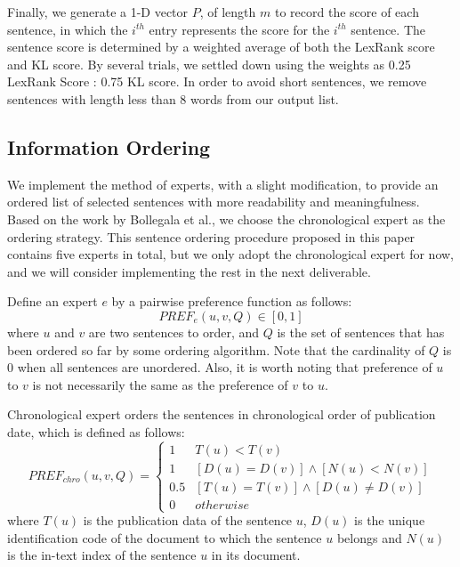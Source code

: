 \documentclass[11pt]{article}
\begin{document}
\indent
Finally, we generate a 1-D vector $P$,  of length $m$ to record the score of each sentence, in which the $i^{th}$ entry represents the score for the $i^{th}$ sentence. The sentence score is determined by a weighted average of both the LexRank score and KL score. By several trials, we settled down using the weights as 0.25 LexRank Score : 0.75 KL score. In order to avoid short sentences, we remove sentences with length less than 8 words from our output list. \\

\subsection{Information Ordering}

We implement the method of experts, with a slight modification, to provide an ordered list of selected sentences with more readability and meaningfulness. Based on the work by Bollegala et al., we choose the chronological expert as the ordering strategy\cite{Bollegala:12}. This sentence ordering procedure proposed in this paper contains five experts in total, but we only adopt the chronological expert for now, and we will consider implementing the rest in the next deliverable. 

\indent
Define an expert $e$ by a pairwise preference function as follows:
\begin{equation}
PREF_e(u,v,Q)\in[0,1]
\end{equation}
where $u$ and $v$ are two sentences to order, and $Q$ is the set of sentences that has been ordered so far by some ordering algorithm. Note that the cardinality of $Q$ is 0 when all sentences are unordered. Also, it is worth noting that preference of $u$ to $v$ is not necessarily the same as the preference of $v$ to $u$. 

\indent
Chronological expert orders the sentences in chronological order of publication date, which is defined as follows:
\tiny
\begin{equation}
PREF_{chro}(u,v,Q)=\begin{cases}
				1 & T(u) < T(v)\\
				1 & [D(u)=D(v)]\wedge[N(u)<N(v)]\\
				0.5 & [T(u)=T(v)]\wedge[D(u)\ne D(v)]\\
				0 & otherwise
				\end{cases}
\end{equation}
\normalsize
where $T(u)$ is the publication data of the sentence $u$, $D(u)$ is the unique identification code of the document to which the sentence $u$ belongs and $N(u)$ is the in-text index of the sentence $u$ in its document.
\end{document}
